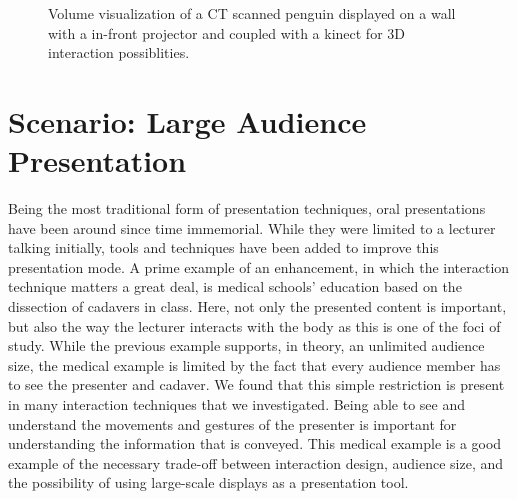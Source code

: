\documentclass[review,journal]{vgtc}         %
\begin{document}
\begin{figure}[htb]
	\centering
	\caption{Volume visualization of a CT scanned penguin displayed on a wall with a in-front projector and coupled with a kinect for 3D interaction possiblities.}
	\label{img:exhibition_kinect}
\end{figure}

\section{Scenario: Large Audience Presentation}

\noindent Being the most traditional form of presentation techniques, oral presentations have been around since time immemorial.
While they were limited to a lecturer talking initially, tools and techniques have been added to improve this presentation mode.
A prime example of an enhancement, in which the interaction technique matters a great deal, is medical schools' education based on the dissection of cadavers in class.
Here, not only the presented content is important, but also the way the lecturer interacts with the body as this is one of the foci of study.
While the previous example supports, in theory, an unlimited audience size, the medical example is limited by the fact that every audience member has to see the presenter and cadaver.
We found that this simple restriction is present in many interaction techniques that we investigated.
Being able to see and understand the movements and gestures of the presenter is important for understanding the information that is conveyed.
This medical example is a good example of the necessary trade-off between interaction design, audience size, and the possibility of using large-scale displays as a presentation tool.
\end{document}
